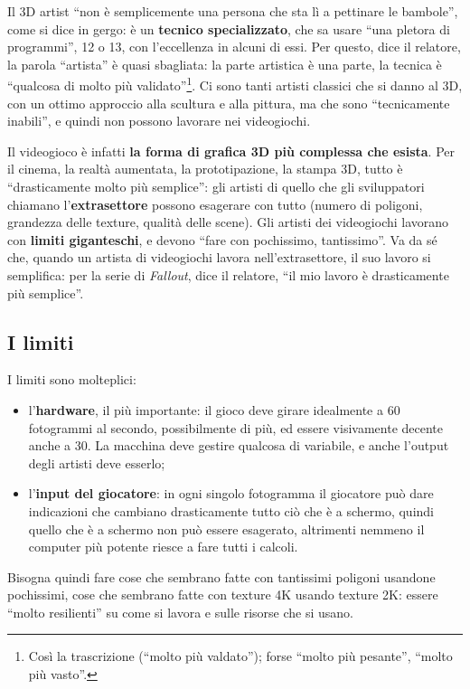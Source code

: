 Il 3D artist ``non è semplicemente una persona che sta lì a pettinare le
bambole'', come si dice in gergo: è un \textbf{tecnico specializzato}, che sa
usare ``una pletora di programmi'', 12 o 13, con l'eccellenza in alcuni di
essi. Per questo, dice il relatore, la parola ``artista'' è quasi sbagliata: la
parte artistica è una parte, la tecnica è ``qualcosa di molto più
validato''\footnote{Così la trascrizione (``molto più valdato''); forse ``molto
più pesante'', ``molto più vasto''.}. Ci sono tanti artisti classici che si
danno al 3D, con un ottimo approccio alla scultura e alla pittura, ma che sono
``tecnicamente inabili'', e quindi non possono lavorare nei videogiochi.

Il videogioco è infatti \textbf{la forma di grafica 3D più complessa che
esista}. Per il cinema, la realtà aumentata, la prototipazione, la stampa 3D,
tutto è ``drasticamente molto più semplice'': gli artisti di quello che gli
sviluppatori chiamano l'\textbf{extrasettore} possono esagerare con tutto
(numero di poligoni, grandezza delle texture, qualità delle scene). Gli artisti
dei videogiochi lavorano con \textbf{limiti giganteschi}, e devono ``fare con
pochissimo, tantissimo''. Va da sé che, quando un artista di videogiochi lavora
nell'extrasettore, il suo lavoro si semplifica: per la serie di
\emph{Fallout}, dice il relatore, ``il mio lavoro è drasticamente più
semplice''.

\subsection{I limiti}

I limiti sono molteplici:
\begin{itemize}
  \item l'\textbf{hardware}, il più importante: il gioco deve girare
        idealmente a 60 fotogrammi al secondo, possibilmente di più, ed essere
        visivamente decente anche a 30. La macchina deve gestire qualcosa di
        variabile, e anche l'output degli artisti deve esserlo;
  \item l'\textbf{input del giocatore}: in ogni singolo fotogramma il giocatore
        può dare indicazioni che cambiano drasticamente tutto ciò che è a
        schermo, quindi quello che è a schermo non può essere esagerato,
        altrimenti nemmeno il computer più potente riesce a fare tutti i
        calcoli.
\end{itemize}
Bisogna quindi fare cose che sembrano fatte con tantissimi poligoni usandone
pochissimi, cose che sembrano fatte con texture 4K usando texture 2K: essere
``molto resilienti'' su come si lavora e sulle risorse che si usano.

